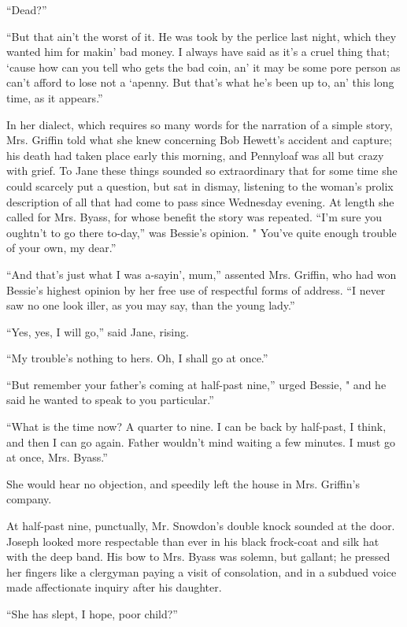 ``Dead?''

``But that ain't the worst of it. He was took by the perlice last night,
which they wanted him for makin' bad money. I always have said as it's a
cruel thing that; `cause how can you tell who gets the bad coin, an' it
may be some pore person as can't afford to lose not a `apenny. But
that's what he's been up to, an' this long time, as it appears.''

In her dialect, which requires so many words for the narration of a
simple story, Mrs. Griffin {\protect\hypertarget{222}{}{}}told what she
knew concerning Bob Hewett's accident and capture; his death had taken
place early this morning, and Pennyloaf was all but crazy with grief. To
Jane these things sounded so extraordinary that for some time she could
scarcely put a question, but sat in dismay, listening to the woman's
prolix description of all that had come to pass since Wednesday evening.
At length she called for Mrs. Byass, for whose benefit the story was
repeated. ``I'm sure you oughtn't to go there to-day,'' was Bessie's
opinion. " You've quite enough trouble of your own, my dear.''

``And that's just what I was a-sayin', mum,'' assented Mrs. Griffin, who
had won Bessie's highest opinion by her free use of respectful forms of
address. ``I never saw no one look iller, as you may say, than the young
lady.''

``Yes, yes, I will go,'' said Jane, rising.

``My trouble's nothing to hers. Oh, I shall go at once.''

``But remember your father's coming at half-past nine,'' urged Bessie, "
and he said he wanted to speak to you particular.''

``What is the time now? A quarter to
{\protect\hypertarget{223}{}{}}nine. I can be back by half-past, I
think, and then I can go again. Father wouldn't mind waiting a few
minutes. I must go at once, Mrs. Byass.''

She would hear no objection, and speedily left the house in Mrs.
Griffin's company.

At half-past nine, punctually, Mr. Snowdon's double knock sounded at the
door. Joseph looked more respectable than ever in his black frock-coat
and silk hat with the deep band. His bow to Mrs. Byass was solemn, but
gallant; he pressed her fingers like a clergyman paying a visit of
consolation, and in a subdued voice made affectionate inquiry after his
daughter.

``She has slept, I hope, poor child?''

